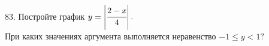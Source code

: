 83. Постройте график $y=\left|\cfrac{2-x}{4}\right|.$\\
При каких значениях аргумента выполняется неравенство $-1\leqslant y<1?$\\
